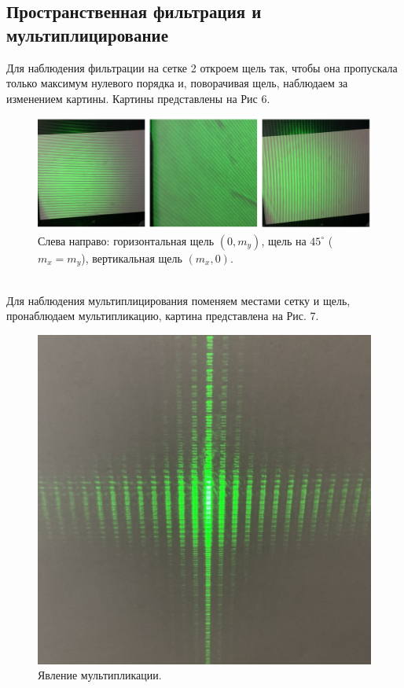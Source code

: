\documentclass[a4paper,12pt]{report}
\begin{document}
\subsection*{ Пространственная фильтрация и мультиплицирование}
Для наблюдения фильтрации на сетке 2 откроем щель так, чтобы она пропускала только максимум нулевого порядка и, поворачивая щель, наблюдаем за изменением картины. Картины представлены на Рис 6.
\begin{figure}[h]
\includegraphics[scale=0.5]{3.png}
\centering
\caption{Слева направо: горизонтальная щель $(0,m_y)$, щель на $45^\circ$ ($m_x = m_y$), вертикальная щель $(m_x,0)$.}
\end{figure}\\
Для наблюдения мультиплицирования поменяем местами сетку и щель, пронаблюдаем мультипликацию, картина представлена на Рис. 7.
\begin{figure}[h]
\includegraphics[scale=0.7]{4.png}
\centering
\caption{Явление мультипликации.}
\end{figure}
\end{document}
